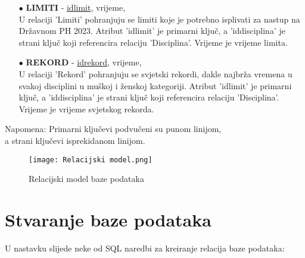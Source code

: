 \documentclass[times, utf8, zavrsni]{fer}
\begin{document}
\begin{itemize}
    \item[$\bullet$] \textbf{LIMITI} - \underline{idlimit}, vrijeme,  \\
    U relaciji 'Limiti' pohranjuju se limiti koje je potrebno isplivati za nastup na Državnom PH 2023. Atribut 'idlimit' je primarni ključ, a 'iddisciplina' 
    je strani ključ koji referencira relaciju 'Disciplina'. Vrijeme je vrijeme limita. 

\vspace{\baselineskip}

    \item[$\bullet$] \textbf{REKORD} - \underline{idrekord}, vrijeme,  \\
    U relaciji 'Rekord' pohranjuju se svjetski rekordi, dakle najbrža vremena u svakoj disciplini u muškoj i ženskoj kategoriji. Atribut 'idlimit' je primarni ključ, 
    a 'iddisciplina' je strani ključ koji referencira relaciju 'Disciplina'. Vrijeme je vrijeme svjetskog rekorda. 
    
\end{itemize}

Napomena: Primarni ključevi podvučeni su punom linijom, \\
\indent a strani ključevi isprekidanom linijom.

\begin{figure}[htb]
    \centering
    \hspace*{-1cm}
    \texttt{[image: Relacijski model.png]}
    \centering
    \caption{Relacijski model baze podataka}
    \label{fig:relacijski model}
\end{figure}

\section{Stvaranje baze podataka}
U nastavku slijede neke od SQL naredbi za kreiranje relacija baze podataka:
\end{document}
